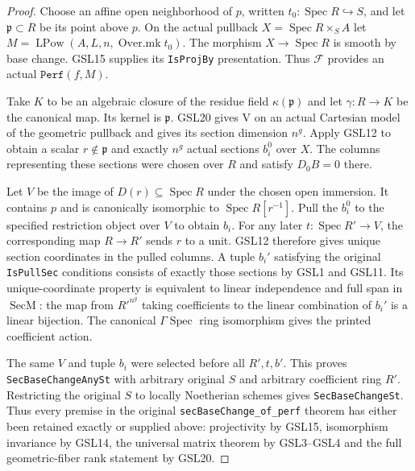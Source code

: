 \begin{proof}
Choose an affine open neighborhood of $p$, written
$t_0:\operatorname{Spec}R\hookrightarrow S$, and let
$\mathfrak p\subset R$ be its point above $p$.
On the actual pullback $X=\operatorname{Spec}R\times_S A$
let $M=\operatorname{LPow}(A,L,n,\operatorname{Over.mk}t_0)$.
The morphism $X\to\operatorname{Spec}R$ is smooth by base
change.  GSL15 supplies its \texttt{IsProjBy} presentation.
Thus $\mathcal F$ provides an actual $\texttt{Perf}(f,M)$.

Take $K$ to be an algebraic closure of the residue field
$\kappa(\mathfrak p)$ and let $\gamma:R\to K$ be the
canonical map.  Its kernel is $\mathfrak p$.
GSL20 gives $\mathrm V$ on an actual Cartesian model of
the geometric pullback and gives its section dimension
$n^g$.  Apply GSL12 to obtain a scalar $r\notin\mathfrak p$
and exactly $n^g$ actual sections $b_i^0$ over $X$.
The columns representing these sections were chosen over
$R$ and satisfy $D_0B=0$ there.

Let $V$ be the image of $D(r)\subseteq\operatorname{Spec}R$
under the chosen open immersion.  It contains $p$ and
is canonically isomorphic to $\operatorname{Spec}R[r^{-1}]$.
Pull the $b_i^0$ to the specified restriction object over
$V$ to obtain $b_i$.  For any later $t:\operatorname{Spec}R'\to V$,
the corresponding map $R\to R'$ sends $r$ to a unit.
GSL12 therefore gives unique section coordinates in the
pulled columns.  A tuple $b_i'$ satisfying the original
\texttt{IsPullSec} conditions consists of exactly those
sections by GSL1 and GSL11.  Its unique-coordinate property
is equivalent to linear independence and full span in
$\operatorname{SecM}$: the map from $R'^{n^g}$ taking
coefficients to the linear combination of $b_i'$ is a
linear bijection.  The canonical $\Gamma\operatorname{Spec}$
ring isomorphism gives the printed coefficient action.

The same $V$ and tuple $b_i$ were selected before all
$R',t,b'$.  This proves \texttt{SecBaseChangeAnySt} with
arbitrary original $S$ and arbitrary coefficient ring $R'$.
Restricting the original $S$ to locally Noetherian schemes
gives \texttt{SecBaseChangeSt}.  Thus every premise in the
original \texttt{secBaseChange\_of\_perf} theorem has either
been retained exactly or supplied above: projectivity by
GSL15, isomorphism invariance by GSL14, the universal matrix
theorem by GSL3--GSL4 and the full geometric-fiber rank
statement by GSL20.
\end{proof}

